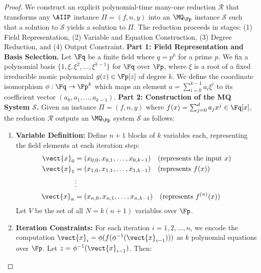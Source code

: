             \begin{proof}
                We construct an explicit polynomial-time many-one reduction $\mathcal{R}$ that transforms any $\AIIP$ instance $\Pi = (f, n, y)$ into an $\MQ_{\Fp}$ instance $\mathcal{S}$ such that a solution to $\mathcal{S}$ yields a solution to $\Pi$. The reduction proceeds in stages: (1) Field Representation, (2) Variable and Equation Construction, (3) Degree Reduction, and (4) Output Constraint.
                \textbf{Part 1: Field Representation and Basis Selection.}
                    Let $\Fq$ be a finite field where $q = p^k$ for a prime $p$. We fix a polynomial basis $\{1, \xi, \xi^2, \ldots, \xi^{k-1}\}$ for $\Fq$ over $\Fp$, where $\xi$ is a root of a fixed irreducible monic polynomial $g(z) \in \Fp[z]$ of degree $k$. We define the coordinate isomorphism $\phi: \Fq \to \Fp^k$ which maps an element $a = \sum_{i=0}^{k-1} a_i \xi^i$ to its coefficient vector $(a_0, a_1, \ldots, a_{k-1})$.
                \textbf{Part 2: Construction of the MQ System $\mathcal{S}$.}
                    Given an instance $\Pi = (f, n, y)$ where $f(x) = \sum_{j=0}^{d} a_j x^j \in \Fq[x]$, the reduction $\mathcal{R}$ outputs an $\MQ_{\Fp}$ system $\mathcal{S}$ as follows:
                    \begin{enumerate}
                        \item \textbf{Variable Definition:} Define $n+1$ blocks of $k$ variables each, representing the field elements at each iteration step:
                        \begin{align*}
                            \vect{x}_0 &= (x_{0,0}, x_{0,1}, \ldots, x_{0,k-1}) \quad \text{(represents the input $x$)} \\
                            \vect{x}_1 &= (x_{1,0}, x_{1,1}, \ldots, x_{1,k-1}) \quad \text{(represents $f(x)$)} \\
                            &\vdots \\
                            \vect{x}_n &= (x_{n,0}, x_{n,1}, \ldots, x_{n,k-1}) \quad \text{(represents $f^{(n)}(x)$)}
                        \end{align*}
                        Let $V$ be the set of all $N = k(n+1)$ variables over $\Fp$.
                        \item \textbf{Iteration Constraints:} For each iteration $i = 1, 2, \ldots, n$, we encode the computation $\vect{x}_i = \phi(f(\phi^{-1}(\vect{x}_{i-1})))$ as $k$ polynomial equations over $\Fp$. Let $z = \phi^{-1}(\vect{x}_{i-1})$. Then:
                            \begin{equation}

\end{equation}
\end{enumerate}
\end{proof}

